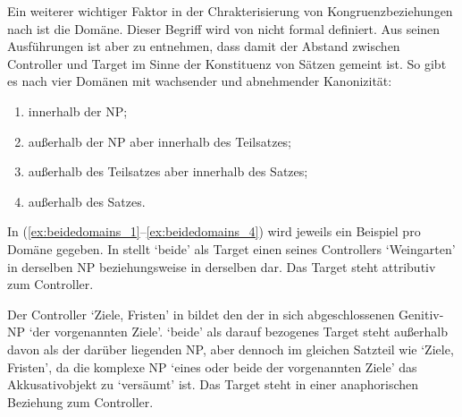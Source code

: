 \label{phsec:domain}

Ein weiterer wichtiger Faktor in der Chrakterisierung von
Kongruenzbeziehungen nach \citet{corbett2006} ist die
Domäne. Dieser Begriff wird von \citet{corbett2006} nicht formal definiert. Aus
seinen Ausführungen ist aber zu entnehmen, dass damit der Abstand zwischen
Controller und Target im Sinne der Konstituenz von Sätzen gemeint ist. So gibt
es nach \citet[54]{corbett2006} vier Domänen mit wachsender  und
abnehmender Kanonizität:

\begin{enumerate}[noitemsep]
	\item innerhalb der NP;
	\item außerhalb der NP aber innerhalb des Teilsatzes;
	\item außerhalb des Teilsatzes aber innerhalb des Satzes;
	\item außerhalb des Satzes.
\end{enumerate}

In (\ref{ex:beidedomains_1}--\ref{ex:beidedomains_4}) wird jeweils ein Beispiel
pro Domäne gegeben. In  stellt  `beide' als
Target einen  seines Controllers  `Weingarten'
in derselben NP beziehungsweise in derselben
 dar. Das Target steht attributiv zum
Controller.


Der Controller  `Ziele, Fristen' in  bildet den
 der in sich abgeschlossenen Genitiv-NP  `der vorgenannten Ziele'. 
`beide' als darauf bezogenes Target steht außerhalb davon als  der
darüber liegenden NP, aber dennoch im gleichen Satzteil wie  `Ziele,
Fristen', da die komplexe NP 
`eines oder beide der vorgenannten Ziele' das Akkusativobjekt zu
 `versäumt' ist. Das Target steht in einer anaphorischen
Beziehung zum Controller.


